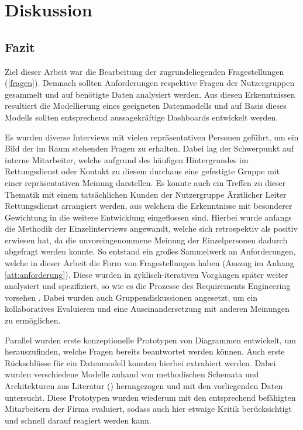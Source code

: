 \chapter{Diskussion}
\label{fazit}
\minitoc\pagebreak

\section{Fazit}
Ziel dieser Arbeit war die Bearbeitung der zugrundeliegenden Fragestellungen (\ref{fragen}).
Demnach sollten Anforderungen respektive Fragen der Nutzergruppen gesammelt und auf benötigte Daten analysiert werden.
Aus diesen Erkenntnissen resultiert die Modellierung eines geeigneten Datenmodells und auf Basis dieses Modells sollten entsprechend aussagekräftige Dashboards entwickelt werden.

Es wurden diverse Interviews mit vielen repräsentativen Personen geführt, um ein Bild der im Raum stehenden Fragen zu erhalten.
Dabei lag der Schwerpunkt auf interne Mitarbeiter, welche aufgrund des häufigen Hintergrundes im Rettungsdienst oder Kontakt zu diesem durchaus eine gefestigte Gruppe mit einer repräsentativen Meinung darstellen.
Es konnte auch ein Treffen zu dieser Thematik mit einem tatsächlichen Kunden der Nutzergruppe \glqq Ärztlicher Leiter Rettungsdienst\grqq{} arrangiert werden, aus welchem die Erkenntnisse mit besonderer Gewichtung in die weitere Entwicklung eingeflossen sind.
Hierbei wurde anfangs die Methodik der Einzelinterviews angewandt, welche sich retrospektiv als positiv erwiesen hat, da die unvoreingenommene Meinung der Einzelpersonen dadurch abgefragt werden konnte.
So entstand ein großes Sammelwerk an Anforderungen, welche in dieser Arbeit die Form von Fragestellungen haben (Auszug im Anhang \ref{att:anforderung}).
Diese wurden in zyklisch-iterativen Vorgängen später weiter analysiert und spezifiziert, so wie es die Prozesse des Requirements Engineering vorsehen \cite{ Bergsmann.2018, Leffingwell.2011, Patig., Pohl.2011}. 
Dabei wurden auch Gruppendiskussionen angesetzt, um ein kollaboratives Evaluieren und eine Auseinandersetzung mit anderen Meinungen zu ermöglichen.

Parallel wurden erste konzeptionelle Prototypen von Diagrammen entwickelt, um herauszufinden, welche Fragen bereits beantwortet werden können.
Auch erste Rückschlüsse für ein Datenmodell konnten hierbei extrahiert werden.
Dabei wurden verschiedene Modelle anhand von methodischen Schemata und Architekturen aus Literatur (\cite{Bauer.2004, Gabriel.2011, Gitelman.2013, Kimball.2013, Mucksch.2000}) herangezogen und mit den vorliegenden Daten untersucht.
Diese Prototypen wurden wiederum mit den entsprechend befähigten Mitarbeitern der Firma evaluiert, sodass auch hier etwaige Kritik berücksichtigt und schnell darauf reagiert werden kann.

